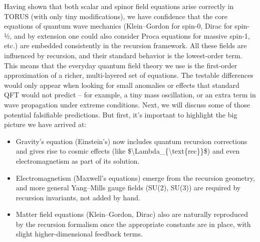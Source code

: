 \documentclass[]{article}
\begin{document}
Having shown that both scalar and spinor field equations arise correctly
in TORUS (with only tiny modifications), we have confidence that the
core equations of quantum wave mechanics (Klein--Gordon for spin-0,
Dirac for spin-½, and by extension one could also consider Proca
equations for massive spin-1, etc.) are embedded consistently in the
recursion framework. All these fields are influenced by recursion, and
their standard behavior is the lowest-order term. This means that the
everyday quantum field theory we use is the first-order approximation of
a richer, multi-layered set of equations. The testable differences would
only appear when looking for small anomalies or effects that standard
QFT would not predict -- for example, a tiny mass oscillation, or an
extra term in wave propagation under extreme conditions. Next, we will
discuss some of those potential falsifiable predictions. But first, it's
important to highlight the big picture we have arrived at:

\begin{itemize}
\item
  Gravity's equation (Einstein's) now includes quantum recursion
  corrections and gives rise to cosmic effects (like
  \$\textbackslash{}Lambda\_\{\textbackslash{}text\{rec\}\}\$) and even
  electromagnetism as part of its solution.
\item
  Electromagnetism (Maxwell's equations) emerge from the recursion
  geometry, and more general Yang--Mills gauge fields (SU(2), SU(3)) are
  required by recursion invariants, not added by hand.
\item
  Matter field equations (Klein--Gordon, Dirac) also are naturally
  reproduced by the recursion formalism once the appropriate constants
  are in place, with slight higher-dimensional feedback terms.
\end{itemize}
\end{document}
